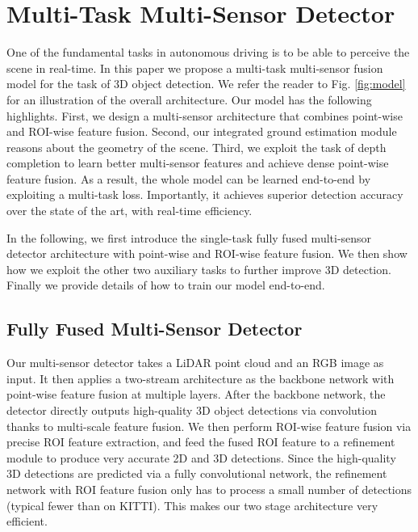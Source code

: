 \documentclass[10pt,twocolumn,letterpaper]{article}
\begin{document}
\section{Multi-Task Multi-Sensor Detector}
One of the fundamental tasks in autonomous driving is to be able to perceive the scene in real-time.  
In this paper we propose a multi-task multi-sensor fusion model for the task of 3D object detection. We refer the reader to Fig. \ref{fig:model} for an illustration of the overall architecture. Our model has the following highlights. 
First, we design a multi-sensor architecture that combines point-wise and ROI-wise feature fusion. 
Second, our integrated ground estimation module reasons about the geometry of the scene. 
Third, we exploit the task of depth completion to learn better multi-sensor features and achieve dense point-wise feature fusion. 
As a result, the whole model can be learned end-to-end by exploiting a multi-task loss. Importantly, it achieves superior detection accuracy over the state of the art, with real-time efficiency.

In the following, we first introduce the single-task fully fused multi-sensor detector architecture with point-wise and ROI-wise feature fusion. We then show how we exploit the other two auxiliary tasks to further improve 3D detection. Finally we provide details of how to train our model end-to-end.

\subsection{Fully Fused Multi-Sensor Detector}
Our  multi-sensor detector takes a LiDAR point cloud and an RGB image as input. It then applies a two-stream architecture as the backbone network with point-wise feature fusion  at multiple layers. After the backbone network, the detector directly outputs high-quality 3D object detections via convolution thanks to multi-scale feature fusion. We then perform ROI-wise feature fusion via precise ROI feature extraction, and feed the fused ROI feature to a refinement module to produce very accurate 2D and 3D detections. Since the high-quality 3D detections are predicted via a fully convolutional network,  the refinement network with ROI feature fusion only has to process a small number of detections (typical fewer than  on KITTI). This makes our two stage architecture very efficient.
\end{document}
